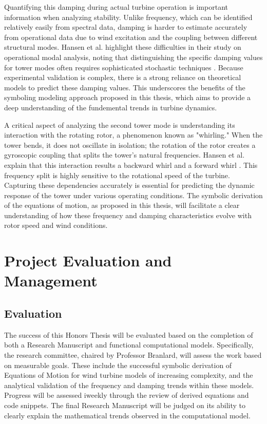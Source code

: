 \documentclass[onecolumn,draftcls]{IEEEtran}
\begin{document}
Quantifying this damping during actual turbine operation is important information when analyzing stability. Unlike frequency, which can be identified relatively easily from spectral data, damping is harder to estimate accurately from operational data due to wind excitation and the coupling between different structural modes. Hansen et al. highlight these difficulties in their study on operational modal analysis, noting that distinguishing the specific damping values for tower modes often requires sophisticated stochastic techniques \cite{hansen2006two}. Because experimental validation is complex, there is a strong reliance on theoretical models to predict these damping values. This underscores the benefits of the symboling modeling approach proposed in this thesis, which aims to provide a deep understanding of the fundemental trends in turbine dynamics.

A critical aspect of analyzing the second tower mode is understanding its interaction with the rotating rotor, a phenomenon known as "whirling." When the tower bends, it does not oscillate in isolation; the rotation of the rotor creates a gyroscopic coupling that splits the tower's natural frequencies. Hansen et al. explain that this interaction results a backward whirl and a forward whirl \cite{hansen2003improved}. This frequency split is highly sensitive to the rotational speed of the turbine. Capturing these dependencies accurately is essential for predicting the dynamic response of the tower under various operating conditions. The symbolic derivation of the equations of motion, as proposed in this thesis, will facilitate a clear understanding of how these frequency and damping characteristics evolve with rotor speed and wind conditions.

\section{Project Evaluation and Management}

\subsection*{Evaluation}
The success of this Honors Thesis will be evaluated based on the completion of both a Research Manuscript and functional computational models. Specifically, the research committee, chaired by Professor Branlard, will assess the work based on measurable goals. These include the successful symbolic derivation of Equations of Motion for wind turbine models of increasing complexity, and the analytical validation of the frequency and damping trends within these models. Progress will be assessed iweekly through the review of derived equations and code snippets. The final Research Manuscript will be judged on its ability to clearly explain the mathematical trends observed in the computational model.
\end{document}
